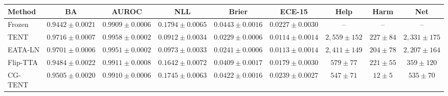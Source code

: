 \footnotesize
\setlength{\tabcolsep}{2.5pt}
\begin{tabular}{lcccccccc}
\toprule
Method & BA & AUROC & NLL & Brier & ECE-15 & Help & Harm & Net \\
\midrule
Frozen & $0.9442\pm0.0021$ & $0.9909\pm0.0006$ & $0.1794\pm0.0065$ & $0.0443\pm0.0016$ & $0.0227\pm0.0030$ & -- & -- & -- \\
TENT & $0.9716\pm0.0007$ & $0.9958\pm0.0002$ & $0.0912\pm0.0034$ & $0.0229\pm0.0006$ & $0.0114\pm0.0014$ & $2{,}559\pm152$ & $227\pm84$ & $2{,}331\pm175$ \\
EATA-LN & $0.9701\pm0.0006$ & $0.9951\pm0.0002$ & $0.0973\pm0.0033$ & $0.0241\pm0.0006$ & $0.0113\pm0.0014$ & $2{,}411\pm149$ & $204\pm78$ & $2{,}207\pm164$ \\
Flip-TTA & $0.9484\pm0.0022$ & $0.9911\pm0.0008$ & $0.1642\pm0.0072$ & $0.0409\pm0.0017$ & $0.0179\pm0.0030$ & $579\pm77$ & $221\pm55$ & $359\pm120$ \\
CG-TENT & $0.9505\pm0.0020$ & $0.9910\pm0.0006$ & $0.1745\pm0.0063$ & $0.0422\pm0.0016$ & $0.0239\pm0.0027$ & $547\pm71$ & $12\pm5$ & $535\pm70$ \\
\bottomrule
\end{tabular}
